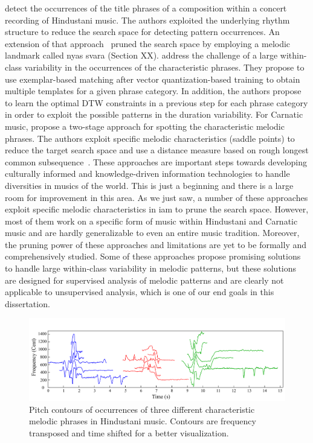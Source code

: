\cite{Ross2012b} detect the occurrences of the title phrases of a composition within a concert recording of Hindustani music. The authors exploited the underlying rhythm structure to reduce the search space for detecting pattern occurrences. An extension of that approach~\citep{Ross2012} pruned the search space by employing a melodic landmark called \gls{nyas} \gls{svara} (Section XX). \cite{Rao2014} address the challenge of a large within-class variability in the occurrences of the characteristic phrases. They propose to use exemplar-based matching after vector quantization-based training to obtain multiple templates for a given phrase category. In addition, the authors propose to learn the optimal DTW constraints in a previous step for each phrase category in order to exploit the possible patterns in the duration variability. For Carnatic music, \cite{Ishwar2013} propose a two-stage approach for spotting the characteristic melodic phrases. The authors exploit specific melodic characteristics (saddle points) to reduce the target search space and use a distance measure based on rough longest common subsequence~\citep{lin2011music}. These approaches are important steps towards developing culturally informed and knowledge-driven information technologies to handle diversities in musics of the world. This is just a beginning and there is a large room for improvement in this area. As we just saw, a number of these approaches exploit specific melodic characteristics in \gls{iam} to prune the search space. However, most of them work on a specific form of music within Hindustani and Carnatic music and are hardly generalizable to even an entire music tradition. Moreover, the pruning power of these approaches and limitations are yet to be formally and comprehensively studied. Some of these approaches propose promising solutions to handle large within-class variability in melodic patterns, but these solutions are designed for supervised analysis of melodic patterns and are clearly not applicable to unsupervised analysis, which is one of our end goals in this dissertation.



\begin{figure}
	\begin{center}
		\includegraphics[width=\figSizeHundred]{ch06_patterns/figures/ImprovingSimilarity/phraseClassesExample.pdf}
	\end{center}
	\caption{Pitch contours of occurrences of three different characteristic melodic phrases in Hindustani music. Contours are frequency transposed and time shifted for a better visualization.}
	\label{fig:phraseComplexityExample}
\end{figure}

